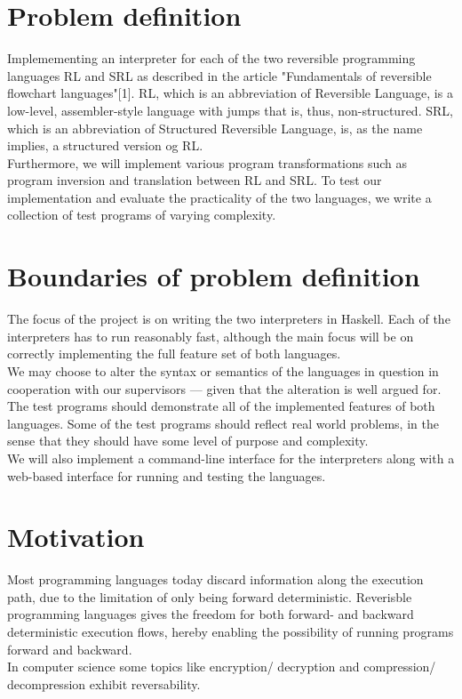\section{Problem definition}
\label{sec:problem_definition}
Implemementing an interpreter for each of the two reversible programming languages RL and SRL as described in the article "Fundamentals of reversible flowchart languages"[1]. RL, which is an abbreviation of Reversible Language, is a low-level, assembler-style language with jumps that is, thus, non-structured. SRL, which is an abbreviation of Structured Reversible Language, is, as the name implies, a structured version og RL. \\
\indent Furthermore, we will implement various program transformations such as program inversion and translation between RL and SRL. %
To test our implementation and evaluate the practicality of the two languages, we write a collection of test programs of varying complexity.

\section{Boundaries of problem definition}
\label{sec:boundaries_of_problem_definition}

The focus of the project is on writing the two interpreters in Haskell. Each of the interpreters has to run reasonably fast, although the main focus will be on correctly implementing the full feature set of both languages. \\
\indent We may choose to alter the syntax or semantics of the languages in question in cooperation with our supervisors --- given that the alteration is well argued for. \\
\indent The test programs should demonstrate all of the implemented features of both languages. Some of the test programs should reflect real world problems, in the sense that they should have some level of purpose and complexity. \\
\indent We will also implement a command-line interface for the interpreters along with a web-based interface for running and testing the languages.

\section{Motivation}
\label{sec:motivation}
Most programming languages today discard information along the execution path, due to the limitation of only being forward deterministic. Reverisble programming languages gives the freedom for both forward- and backward deterministic execution flows, hereby enabling the possibility of running programs forward and backward.\\
\indent In computer science some topics like encryption/ decryption and compression/ decompression exhibit reversability.

